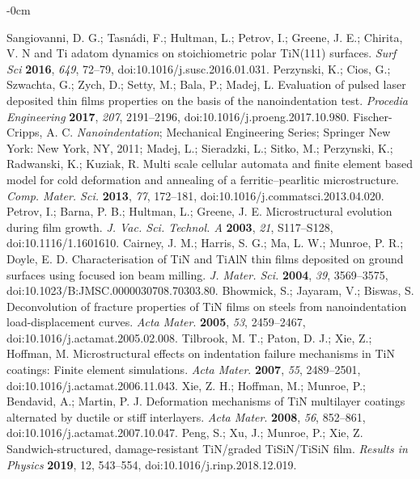 \documentclass[journal,article,submit,pdftex,moreauthors]{Definitions/mdpi}
\begin{document}
\begin{adjustwidth}{-\extralength}{0cm}
\begin{thebibliography}{999}
Sangiovanni, D. G.; Tasnádi, F.; Hultman, L.; Petrov, I.; Greene, J. E.; Chirita, V. N and Ti adatom dynamics on stoichiometric polar TiN(111) surfaces. \textit{Surf Sci} \textbf{2016}, \textit{649}, 72–79, doi:10.1016/j.susc.2016.01.031.
Perzynski, K.; Cios, G.; Szwachta, G.; Zych, D.; Setty, M.; Bala, P.; Madej, L. Evaluation of pulsed laser deposited thin films properties on the basis of the nanoindentation test. \textit{Procedia Engineering} \textbf{2017}, \textit{207}, 2191–2196, doi:10.1016/j.proeng.2017.10.980.
Fischer-Cripps, A. C. \textit{Nanoindentation}; Mechanical Engineering Series; Springer New York: New York, NY, 2011;
Madej, L.; Sieradzki, L.; Sitko, M.; Perzynski, K.; Radwanski, K.; Kuziak, R. Multi scale cellular automata and finite element based model for cold deformation and annealing of a ferritic–pearlitic microstructure. \textit{Comp. Mater. Sci.} \textbf{2013}, \textit{77}, 172–181, doi:10.1016/j.commatsci.2013.04.020.
Petrov, I.; Barna, P. B.; Hultman, L.; Greene, J. E. Microstructural evolution during film growth. \textit{J. Vac. Sci. Technol. A} \textbf{2003}, \textit{21}, S117–S128, doi:10.1116/1.1601610.
Cairney, J. M.; Harris, S. G.; Ma, L. W.; Munroe, P. R.; Doyle, E. D. Characterisation of TiN and TiAlN thin films deposited on ground surfaces using focused ion beam milling. \textit{J. Mater. Sci.} \textbf{2004}, \textit{39}, 3569–3575, doi:10.1023/B:JMSC.0000030708.70303.80.
Bhowmick, S.; Jayaram, V.; Biswas, S. Deconvolution of fracture properties of TiN films on steels from nanoindentation load-displacement curves. \textit{Acta Mater}. \textbf{2005}, \textit{53}, 2459–2467, doi:10.1016/j.actamat.2005.02.008.
Tilbrook, M. T.; Paton, D. J.; Xie, Z.; Hoffman, M. Microstructural effects on indentation failure mechanisms in TiN coatings: Finite element simulations. \textit{Acta Mater}. \textbf{2007}, \textit{55}, 2489–2501, doi:10.1016/j.actamat.2006.11.043.
Xie, Z. H.; Hoffman, M.; Munroe, P.; Bendavid, A.; Martin, P. J. Deformation mechanisms of TiN multilayer coatings alternated by ductile or stiff interlayers. \textit{Acta Mater}. \textbf{2008}, \textit{56}, 852–861, doi:10.1016/j.actamat.2007.10.047.
Peng, S.; Xu, J.; Munroe, P.; Xie, Z. Sandwich-structured, damage-resistant TiN/graded TiSiN/TiSiN film. \textit{Results in Physics} \textbf{2019}, 12, 543–554, doi:10.1016/j.rinp.2018.12.019.
\end{thebibliography}
 
\end{adjustwidth}
\end{document}
